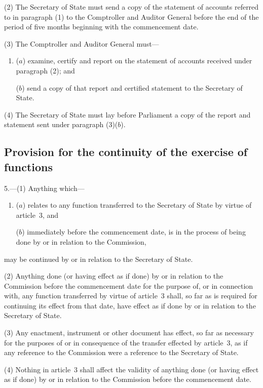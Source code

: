 \documentclass[12pt,a4paper]{article}
\begin{document}
(2) The Secretary of State must send a copy of the statement of accounts referred to in paragraph (1) to the Comptroller and Auditor General before the end of the period of five months beginning with the commencement date.

(3) The Comptroller and Auditor General must—
\begin{enumerate}\item[]
($a$) examine, certify and report on the statement of accounts received under paragraph (2); and

($b$) send a copy of that report and certified statement to the Secretary of State.
\end{enumerate}

(4) The Secretary of State must lay before Parliament a copy of the report and statement sent under paragraph (3)($b$).

\subsection[5. Provision for the continuity of the exercise of functions]{Provision for the continuity of the exercise of functions}

5.---(1)  Anything which—
\begin{enumerate}\item[]
($a$) relates to any function transferred to the Secretary of State by virtue of article~3, and

($b$) immediately before the commencement date, is in the process of being done by or in relation to the Commission,
\end{enumerate}
may be continued by or in relation to the Secretary of State.

(2) Anything done (or having effect as if done) by or in relation to the Commission before the commencement date for the purpose of, or in connection with, any function transferred by virtue of article~3 shall, so far as is required for continuing its effect from that date, have effect as if done by or in relation to the Secretary of State.

(3) Any enactment, instrument or other document has effect, so far as necessary for the purposes of or in consequence of the transfer effected by article~3, as if any reference to the Commission were a reference to the Secretary of State.

(4) Nothing in article~3 shall affect the validity of anything done (or having effect as if done) by or in relation to the Commission before the commencement date.
\end{document}
